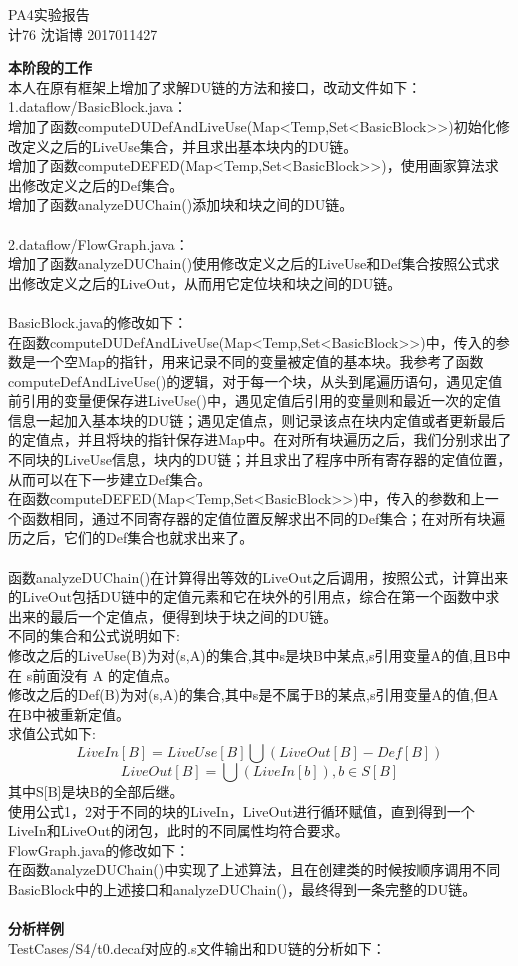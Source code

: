 \documentclass[UTF8]{ctexart}
\begin{document}
\begin{center}
PA4实验报告\\
计76 沈诣博 2017011427
\end{center}
\textbf{本阶段的工作}\\
本人在原有框架上增加了求解DU链的方法和接口，改动文件如下：\\
1.dataflow/BasicBlock.java：\\
增加了函数computeDUDefAndLiveUse(Map<Temp,Set<BasicBlock>>)初始化修改定义之后的LiveUse集合，并且求出基本块内的DU链。\\
增加了函数computeDEFED(Map<Temp,Set<BasicBlock>>)，使用画家算法求出修改定义之后的Def集合。\\
增加了函数analyzeDUChain()添加块和块之间的DU链。\\\\
2.dataflow/FlowGraph.java：\\
增加了函数analyzeDUChain()使用修改定义之后的LiveUse和Def集合按照公式求出修改定义之后的LiveOut，从而用它定位块和块之间的DU链。\\\\
BasicBlock.java的修改如下：\\
在函数computeDUDefAndLiveUse(Map<Temp,Set<BasicBlock>>)中，传入的参数是一个空Map的指针，用来记录不同的变量被定值的基本块。我参考了函数computeDefAndLiveUse()的逻辑，对于每一个块，从头到尾遍历语句，遇见定值前引用的变量便保存进LiveUse()中，遇见定值后引用的变量则和最近一次的定值信息一起加入基本块的DU链；遇见定值点，则记录该点在块内定值或者更新最后的定值点，并且将块的指针保存进Map中。在对所有块遍历之后，我们分别求出了不同块的LiveUse信息，块内的DU链；并且求出了程序中所有寄存器的定值位置，从而可以在下一步建立Def集合。\\
在函数computeDEFED(Map<Temp,Set<BasicBlock>>)中，传入的参数和上一个函数相同，通过不同寄存器的定值位置反解求出不同的Def集合；在对所有块遍历之后，它们的Def集合也就求出来了。\\\\
函数analyzeDUChain()在计算得出等效的LiveOut之后调用，按照公式，计算出来的LiveOut包括DU链中的定值元素和它在块外的引用点，综合在第一个函数中求出来的最后一个定值点，便得到块于块之间的DU链。\\
不同的集合和公式说明如下:\\
修改之后的LiveUse(B)为对(s,A)的集合,其中s是块B中某点,s引用变量A的值,且B中在 s前面没有 A 的定值点。\\
修改之后的Def(B)为对(s,A)的集合,其中s是不属于B的某点,s引用变量A的值,但A在B中被重新定值。\\
求值公式如下:
$$LiveIn[B] = LiveUse[B]\bigcup (LiveOut[B]-Def[B])$$
$$LiveOut[B] = \bigcup (LiveIn[b]), b\in S[B]$$
其中S[B]是块B的全部后继。\\
使用公式1，2对于不同的块的LiveIn，LiveOut进行循环赋值，直到得到一个LiveIn和LiveOut的闭包，此时的不同属性均符合要求。\\
FlowGraph.java的修改如下：\\
在函数analyzeDUChain()中实现了上述算法，且在创建类的时候按顺序调用不同BasicBlock中的上述接口和analyzeDUChain()，最终得到一条完整的DU链。\\\\
\textbf{分析样例}\\ 
TestCases/S4/t0.decaf对应的.s文件输出和DU链的分析如下：
\end{document}
